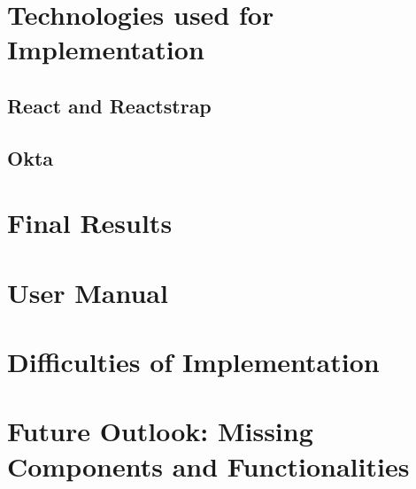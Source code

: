 \chapter{Technologies used for Implementation}
\section{React and Reactstrap}
\section{Okta}
\chapter{Final Results}
\chapter{User Manual}
\chapter{Difficulties of Implementation}
\chapter{Future Outlook: Missing Components and Functionalities}



